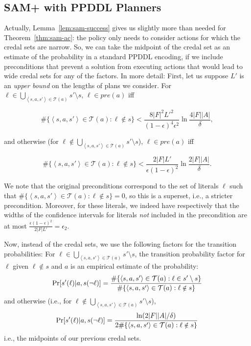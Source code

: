 \documentclass[letterpaper]{article} %
\newcommand{\pre}{\textit{pre}}
\newcommand{\tuple}[1]{\ensuremath{\left \langle #1 \right \rangle }}
\begin{document}
\subsection{SAM+ with PPDDL Planners}
Actually, Lemma~\ref{lem:sam-success} gives us slightly more than needed for Theorem~\ref{thm:sam-ac}: the policy only needs to consider actions for which the credal sets are narrow. So, we can take the midpoint of the credal set as an estimate of the probability in a standard PPDDL encoding, if we include 
preconditions
that prevent a solution from executing actions that would lead to wide credal sets for any of the factors. In more detail: First, let us suppose $L'$ is an {\em upper bound} on the lengths of plans we consider. For $\ell\in\bigcup_{\tuple{s, a, s'}\in \mathcal{T}(a)} s'\setminus s $, $\ell\in\pre(a)$ iff 
\begin{small}
\begin{equation*}
\#\{\tuple{s, a, s'}\in \mathcal{T}(a):\ell\notin s\}< \frac{8|F|^2L'^2}{(1-\epsilon)^4\epsilon^2}\ln\frac{4|F||A|}{\delta},
\end{equation*}
\end{small}
and otherwise (for $\ell\notin\bigcup_{\tuple{s, a, s'}\in \mathcal{T}(a)} s'\setminus s $),  $\ell\in\pre(a)$ iff 
\begin{small}
\begin{equation*}
\#\{\tuple{s, a, s'}\in \mathcal{T}(a):\ell\notin s\}<\frac{2|F|L'}{\epsilon(1-\epsilon)^2}\ln\frac{2|F||A|}{\delta}.
\end{equation*}
\end{small}
We note that the original preconditions correspond to the set of literals $\ell$ such that $\#\{\tuple{s, a, s'}\in \mathcal{T}(a):\ell\notin s\}=0$, so this is a superset, i.e., a stricter precondition. Moreover, for these literals, we indeed have respectively that the widths of the confidence intervals for literals {\em not} included in the precondition are at most $\frac{\epsilon(1-\epsilon)^2}{2|F|L'}=\epsilon_2$.

Now, instead of the credal sets, we use the following factors for the transition probabilities: For $\ell\in\bigcup_{\tuple{s, a, s'}\in \mathcal{T}(a)} s'\setminus s $, the transition probability factor for $\ell$ given $\ell\notin s$ and $a$ is an empirical estimate of the probability:
\begin{equation}
\small
\Pr[s'(\ell)|a,s(\neg\ell)]=\frac{\#\{\tuple{s, a, s'}\in \mathcal{T}(a):\ell\in s'\setminus s\}}{\#\{\tuple{s, a, s'}\in \mathcal{T}(a):\ell \notin s\}}
\end{equation}
and otherwise (i.e., for $\ell\notin\bigcup_{\tuple{s, a, s'}\in \mathcal{T}(a)} s'\setminus s $),
\begin{equation}
\small
\Pr[s'(\ell)|a,s(\neg\ell)]=\frac{\ln(2|F||A|/\delta)}{2\#\{\tuple{s, a, s'}\in \mathcal{T}(a):\ell\notin s\}}
\end{equation}
i.e., the midpoints of our previous credal sets.
\end{document}
